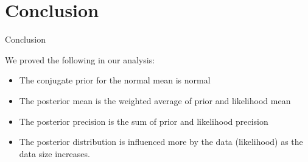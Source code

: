 \section{Conclusion}

\begin{frame}{Conclusion}

We proved the following in our analysis:

\begin{itemize}
  \item The conjugate prior for the normal mean is normal
  \item The posterior mean is the weighted average of prior and likelihood mean
  \item The posterior precision is the sum of prior and likelihood precision
  \item The posterior distribution is influenced more by the data (likelihood) as the data size increases.
\end{itemize}
  
\end{frame}
